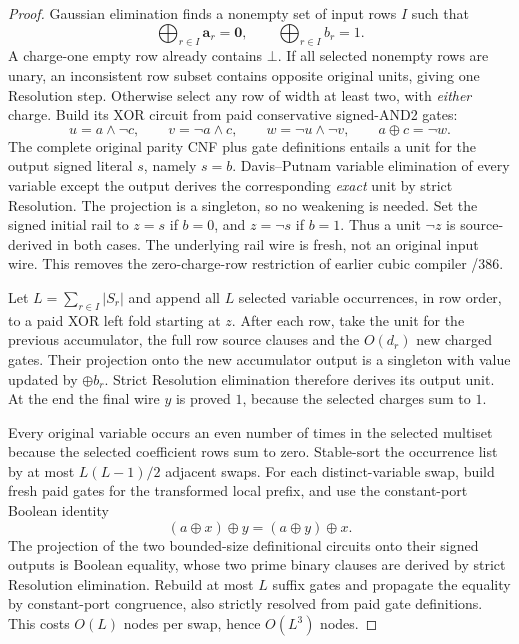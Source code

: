 \documentclass[11pt]{article}
\begin{document}
\begin{proof}
Gaussian elimination finds a nonempty set of input rows $I$ such that
\[
 \bigoplus_{r\in I}\mathbf a_r=\mathbf0,\qquad
 \bigoplus_{r\in I}b_r=1.
\]
A charge-one empty row already contains $\bot$. If all selected nonempty rows are unary, an inconsistent row subset contains opposite original units, giving one Resolution step. Otherwise select any row of width at least two, with \emph{either} charge. Build its XOR circuit from paid conservative signed-AND2 gates:
\[
 u=a\land\neg c,\qquad v=\neg a\land c,\qquad
 w=\neg u\land\neg v,\qquad a\oplus c=\neg w.
\]
The complete original parity CNF plus gate definitions entails a unit for the output signed literal $s$, namely $s=b$. Davis--Putnam variable elimination \cite{DavisPutnam60} of every variable except the output derives the corresponding \emph{exact} unit by strict Resolution. The projection is a singleton, so no weakening is needed. Set the signed initial rail to $z=s$ if $b=0$, and $z=\neg s$ if $b=1$. Thus a unit $\neg z$ is source-derived in both cases. The underlying rail wire is fresh, not an original input wire. This removes the zero-charge-row restriction of earlier cubic compiler /386.

Let $L=\sum_{r\in I}|S_r|$ and append all $L$ selected variable occurrences, in row order, to a paid XOR left fold starting at $z$. After each row, take the unit for the previous accumulator, the full row source clauses and the $O(d_r)$ new charged gates. Their projection onto the new accumulator output is a singleton with value updated by $\oplus b_r$. Strict Resolution elimination therefore derives its output unit. At the end the final wire $y$ is proved $1$, because the selected charges sum to $1$.

Every original variable occurs an even number of times in the selected multiset because the selected coefficient rows sum to zero. Stable-sort the occurrence list by at most $L(L-1)/2$ adjacent swaps. For each distinct-variable swap, build fresh paid gates for the transformed local prefix, and use the constant-port Boolean identity
\[
 (a\oplus x)\oplus y=(a\oplus y)\oplus x.
\]
The projection of the two bounded-size definitional circuits onto their signed outputs is Boolean equality, whose two prime binary clauses are derived by strict Resolution elimination. Rebuild at most $L$ suffix gates and propagate the equality by constant-port congruence, also strictly resolved from paid gate definitions. This costs $O(L)$ nodes per swap, hence $O(L^3)$ nodes.


\end{proof}
\end{document}
